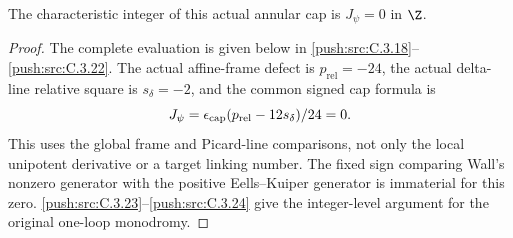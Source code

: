 \begin{corollary}\label{push:src:C.3.15}
The characteristic integer of this actual annular cap is
$J_\psi=0$ in $\Z$.
\end{corollary}
\begin{proof}
The complete evaluation is given below in \ref{push:src:C.3.18}--\ref{push:src:C.3.22}.
The actual affine-frame defect is $p_{\mathrm{rel}}=-24$,
the actual delta-line relative square is $s_\delta=-2$, and
the common signed cap formula is
\[
 J_\psi=\epsilon_{\rm cap}
              (p_{\mathrm{rel}}-12s_\delta)/24=0.
\]
This uses the global frame and Picard-line comparisons, not
only the local unipotent derivative or a target linking number.
The fixed sign comparing Wall's nonzero generator with the
positive Eells--Kuiper generator is immaterial for this zero.
\ref{push:src:C.3.23}--\ref{push:src:C.3.24} give the integer-level argument for the original
one-loop monodromy.
\end{proof}
